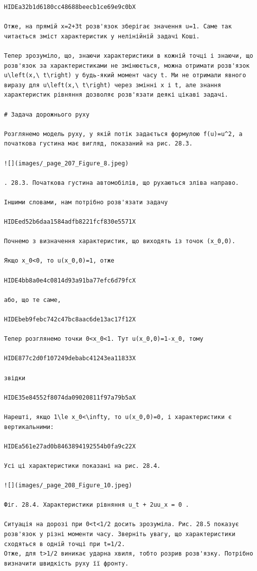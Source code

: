 \documentclass[
  ukrainian,
]{article}
\begin{document}
\begin{verbatim}
HIDEa32b1d6180cc48688beecb1ce69e9c0bX

Отже, на прямій x=2+3t розв'язок зберігає значення u=1. Саме так читається зміст характеристик у нелінійній задачі Коші.

Тепер зрозуміло, що, знаючи характеристики в кожній точці і знаючи, що розв'язок за характеристиками не змінюється, можна отримати розв'язок u\left(x,\ t\right) у будь-який момент часу t. Ми не отримали явного виразу для u\left(x,\ t\right) через змінні x і t, але знання характеристик рівняння дозволяє розв'язати деякі цікаві задачі.

# Задача дорожнього руху

Розглянемо модель руху, у якій потік задається формулою f(u)=u^2, а початкова густина має вигляд, показаний на рис. 28.3.

![](images/_page_207_Figure_8.jpeg)

. 28.3. Початкова густина автомобілів, що рухаються зліва направо.

Іншими словами, нам потрібно розв'язати задачу

HIDEed52b6daa1584adfb8221fcf830e5571X

Почнемо з визначення характеристик, що виходять із точок (x_0,0).

Якщо x_0<0, то u(x_0,0)=1, отже

HIDE4bb8a0e4c0814d93a91ba77efc6d79fcX

або, що те саме,

HIDEbeb9febc742c47bc8aac6de13ac17f12X

Тепер розглянемо точки 0<x_0<1. Тут u(x_0,0)=1-x_0, тому

HIDE877c2d0f107249debabc41243ea11833X

звідки

HIDE35e84552f8074da09020811f97a79b5aX

Нарешті, якщо 1\le x_0<\infty, то u(x_0,0)=0, і характеристики є вертикальними:

HIDEa561e27ad0b8463894192554b0fa9c22X

Усі ці характеристики показані на рис. 28.4.

![](images/_page_208_Figure_10.jpeg)

Фіг. 28.4. Характеристики рівняння u_t + 2uu_x = 0 .

Ситуація на дорозі при 0<t<1/2 досить зрозуміла. Рис. 28.5 показує розв'язок у різні моменти часу. Зверніть увагу, що характеристики сходяться в одній точці при t=1/2.
Отже, для t>1/2 виникає ударна хвиля, тобто розрив розв'язку. Потрібно визначити швидкість руху її фронту.


\end{verbatim}
\end{document}
